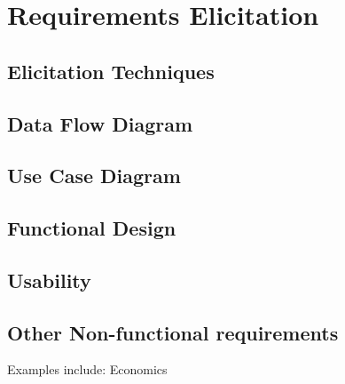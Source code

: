 %
%
\chapter{Requirements Elicitation}

\section{Elicitation Techniques}

\section{Data Flow Diagram}

\section{Use Case Diagram}

\section{Functional Design}

\section{Usability}

\section{Other Non-functional requirements}

Examples include: Economics

\clearpage